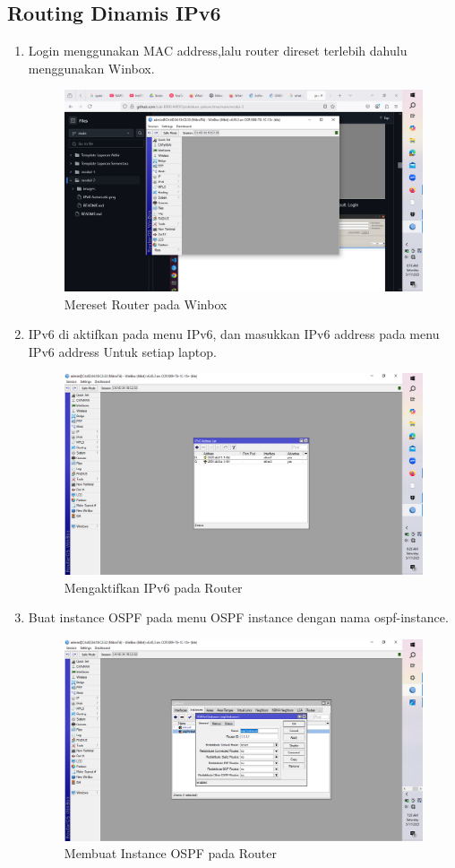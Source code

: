 \subsection{Routing Dinamis IPv6}
\begin{enumerate}
    \item Login menggunakan MAC address,lalu router direset terlebih dahulu menggunakan Winbox.
    \begin{figure}[H]
        \centering
        \includegraphics[width=0.5\linewidth]{gambar1.png}
        \caption{Mereset Router pada Winbox}
        \label{fig:gambar1}
    \end{figure}
    \item IPv6 di aktifkan pada menu IPv6, dan masukkan IPv6 address pada menu IPv6 address Untuk setiap
    laptop.
    \begin{figure}[H]
        \centering
        \includegraphics[width=0.5\linewidth]{gambar2.png}
        \caption{Mengaktifkan IPv6 pada Router}
        \label{fig:gambar2}
    \end{figure}
    \item Buat instance OSPF pada menu OSPF instance dengan nama ospf-instance.
    \begin{figure}[H]
        \centering
        \includegraphics[width=0.5\linewidth]{gambar5.png}
        \caption{Membuat Instance OSPF pada Router}
        \label{fig:gambar6}

\end{figure}
\end{enumerate}
